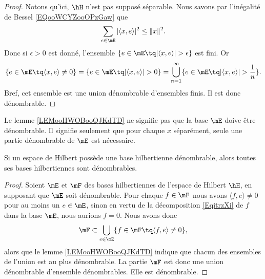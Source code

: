 \begin{proof}
    Notons qu'ici, \( \hH\) n'est pas supposé séparable. Nous savons par l'inégalité de Bessel \eqref{EQooWCYZooOPzGaw} que
    \begin{equation}
        \sum_{e\in\mE}| \langle x, e\rangle  |^2\leq \| x \|^2.
    \end{equation}
    Donc si \( \epsilon>0\) est donné, l'ensemble \( \{ e\in \mE\tq| \langle x, e\rangle  |>\epsilon \}\) est fini. Or
    \begin{equation}
        \{ e\in\mE\tq \langle x, e\rangle \neq 0  \}=\{ e\in\mE\tq| \langle x, e\rangle  |>0 \}=\bigcup_{n=1}^{\infty}\{ e\in\mE\tq | \langle x, e\rangle  |>\frac{1}{ n } \}.
    \end{equation}
    Bref, cet ensemble est une union dénombrable d'ensembles finis. Il est donc dénombrable.
\end{proof}

\begin{remark}
    Le lemme \ref{LEMooHWOBooQJKdTD} ne signifie pas que la base \( \mE\) doive être dénombrable. Il signifie seulement que pour chaque \( x\) séparément, seule une partie dénombrable de \( \mE\) est nécessaire.
\end{remark}

\begin{corollary}       \label{CORooFROTooNupAQs}
    Si un espace de Hilbert possède une base hilbertienne dénombrable, alors toutes ses bases hilbertiennes sont dénombrables.
\end{corollary}

\begin{proof}
    Soient \( \mE\) et \( \mF\) des bases hilbertiennes de l'espace de Hilbert \( \hH\), en supposant que \( \mE\) soit dénombrable. Pour chaque \( f\in \mF\) nous avons \( \langle f, e\rangle \neq 0\) pour au moins un \( e\in\mE\), sinon en vertu de la décomposition \eqref{EqitrzXi} de \( f\) dans la base \( \mE\), nous aurions \( f=0\). Nous avons donc
    \begin{equation}    \label{EQooKRTFooNABXnH}
        \mF\subset\bigcup_{e\in \mE}\{ f\in\mF\tq \langle f, e\rangle \neq 0 \},
    \end{equation}
    alors que le lemme \ref{LEMooHWOBooQJKdTD} indique que chacun des ensembles de l'union est au plus dénombrable. La partie \( \mF\) est donc une union dénombrable d'ensemble dénombrables. Elle est dénombrable.
\end{proof}

